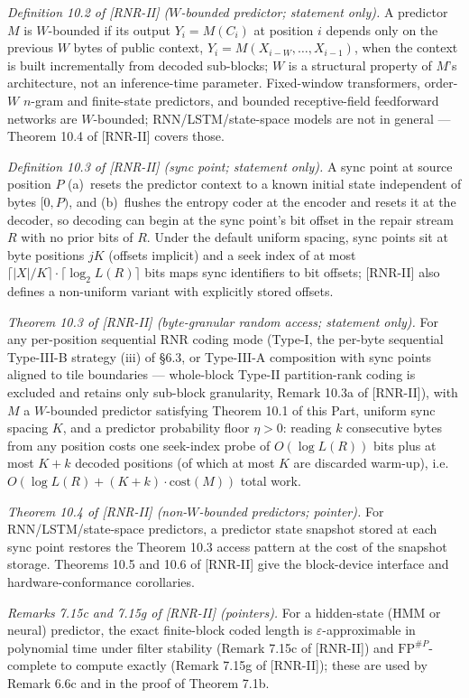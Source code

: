\documentclass[
]{article}
\begin{document}
\emph{Definition 10.2 of [RNR-II] ($W$-bounded predictor; statement
only).} A predictor $M$ is $W$-bounded if its output $Y_i = M(C_i)$ at
position $i$ depends only on the previous $W$ bytes of public context,
$Y_i = M(X_{i-W}, \ldots, X_{i-1})$, when the context is built
incrementally from decoded sub-blocks; $W$ is a structural property of
$M$'s architecture, not an inference-time parameter. Fixed-window
transformers, order-$W$ $n$-gram and finite-state predictors, and
bounded receptive-field feedforward networks are $W$-bounded;
RNN/LSTM/state-space models are not in general --- Theorem 10.4 of
[RNR-II] covers those.

\emph{Definition 10.3 of [RNR-II] (sync point; statement only).} A sync
point at source position $P$ (a)~resets the predictor context to a
known initial state independent of bytes $[0, P)$, and (b)~flushes the
entropy coder at the encoder and resets it at the decoder, so decoding
can begin at the sync point's bit offset in the repair stream $R$ with
no prior bits of $R$. Under the default uniform spacing, sync points
sit at byte positions $jK$ (offsets implicit) and a seek index of at
most $\lceil |X|/K \rceil \cdot \lceil \log_2 L(R) \rceil$ bits maps
sync identifiers to bit offsets; [RNR-II] also defines a non-uniform
variant with explicitly stored offsets.

\emph{Theorem 10.3 of [RNR-II] (byte-granular random access; statement
only).} For any per-position sequential RNR coding mode (Type-I, the
per-byte sequential Type-III-B strategy (iii) of §6.3, or Type-III-A
composition with sync points aligned to tile boundaries --- whole-block
Type-II partition-rank coding is excluded and retains only sub-block
granularity, Remark 10.3a of [RNR-II]), with $M$ a $W$-bounded
predictor satisfying Theorem 10.1 of this Part, uniform sync spacing
$K$, and a predictor probability floor $\eta > 0$: reading $k$
consecutive bytes from any position costs one seek-index probe of
$O(\log L(R))$ bits plus at most $K + k$ decoded positions (of which at
most $K$ are discarded warm-up), i.e.\ $O(\log L(R) + (K + k) \cdot
\mathrm{cost}(M))$ total work.

\emph{Theorem 10.4 of [RNR-II] (non-$W$-bounded predictors; pointer).}
For RNN/LSTM/state-space predictors, a predictor state snapshot stored
at each sync point restores the Theorem 10.3 access pattern at the cost
of the snapshot storage. Theorems 10.5 and 10.6 of [RNR-II] give the
block-device interface and hardware-conformance corollaries.

\emph{Remarks 7.15c and 7.15g of [RNR-II] (pointers).} For a
hidden-state (HMM or neural) predictor, the exact finite-block coded
length is $\varepsilon$-approximable in polynomial time under filter
stability (Remark 7.15c of [RNR-II]) and $\mathrm{FP}^{\#P}$-complete to compute
exactly (Remark 7.15g of [RNR-II]); these are used by Remark 6.6c and in the proof
of Theorem 7.1b.
\end{document}
